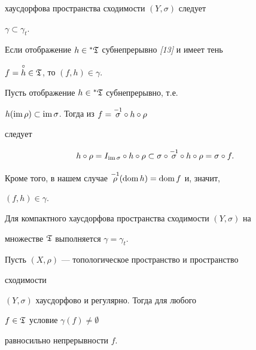 хаусдорфова пространства сходимости $(Y,\sigma)$ следует


$\gamma\subset\gamma_t$.





\begin{lem}


Если отображение $h\in{}^*\frak T$ субнепрерывно {\em [13]} и имеет тень


$f=\overset{\circ}{h}{}\in\frak T$, то $(f,h)\in\gamma$.


\end{lem}





\begin{pf}


Пусть отображение $h\in{}^*\frak T$ субнепрерывно, т.е.


$h(\operatorname{im}\rho)\subset\operatorname{im}\sigma$. Тогда из $f=\overset{-1}{\sigma}{}\circ h\circ \rho$


следует


$$


h\circ \rho=I_{\imm\sigma}\circ h\circ \rho\subset\sigma\circ \mis


\circ h\circ \rho=\sigma\circ f.


$$


Кроме того, в нашем случае $\overset{-1}{\rho}{} (\operatorname{dom} h)=\operatorname{dom} f$ и, значит,


$(f,h)\in\gamma$.


\end{pf}





\begin{cor}


Для компактного хаусдорфова пространства сходимости $(Y,\sigma)$ на


множестве $\frak T$ выполняется $\gamma=\gamma_t$.


\end{cor}





\begin{thm}


Пусть $(X,\rho)$ --- топологическое пространство и пространство


сходимости


$(Y,\sigma)$ хаусдорфово и регулярно. Тогда для любого


$f\in\frak T$ условие $\gamma(f)\ne\emptyset$


равносильно непрерывности $f$.


\end{thm}





